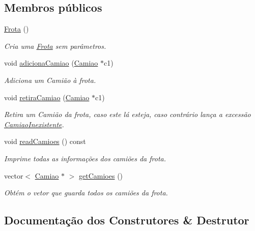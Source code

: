 \subsection*{Membros públicos}
\begin{DoxyCompactItemize}
\item 
\hyperlink{class_frota_a0c7df66d110f59687c6c0b4a389be3a5}{Frota} ()
\begin{DoxyCompactList}\small\item\em Cria uma \hyperlink{class_frota}{Frota} sem parâmetros. \end{DoxyCompactList}\item 
void \hyperlink{class_frota_acaee94330b568acfac215c948b14bbce}{adiciona\+Camiao} (\hyperlink{class_camiao}{Camiao} $\ast$c1)
\begin{DoxyCompactList}\small\item\em Adiciona um Camião à frota. \end{DoxyCompactList}\item 
void \hyperlink{class_frota_a1c41f85e1a72c187cfd42308e97e187b}{retira\+Camiao} (\hyperlink{class_camiao}{Camiao} $\ast$c1)
\begin{DoxyCompactList}\small\item\em Retira um Camião da frota, caso este lá esteja, caso contrário lança a excessão \hyperlink{class_camiao_inexistente}{Camiao\+Inexistente}. \end{DoxyCompactList}\item 
void \hyperlink{class_frota_a500d79d6e1e93e12311ad3a6070a9930}{read\+Camioes} () const 
\begin{DoxyCompactList}\small\item\em Imprime todas as informações dos camiões da frota. \end{DoxyCompactList}\item 
vector$<$ \hyperlink{class_camiao}{Camiao} $\ast$ $>$ \hyperlink{class_frota_a16889ffed14ba42e65d5f4e1fdf0887d}{get\+Camioes} ()
\begin{DoxyCompactList}\small\item\em Obtém o vetor que guarda todos os camiões da frota. \end{DoxyCompactList}\end{DoxyCompactItemize}


\subsection{Documentação dos Construtores \& Destrutor}
\hypertarget{class_frota_a0c7df66d110f59687c6c0b4a389be3a5}{}
